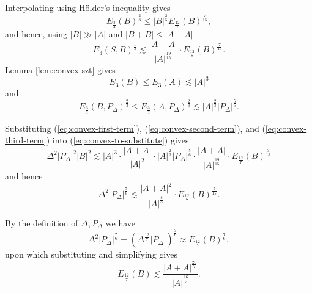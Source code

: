 \documentclass[reqno]{amsart}
\newcommand{\holder}{H\"older}
\numberwithin{equation}{section}
\begin{document}
Interpolating using \holder's inequality gives
\[
    E_{\frac{3}{2} } (B)^{\frac{2}{3} } \leq \left\lvert B \right\rvert ^{\frac{2}{5} }  E_{\frac{12}{7} } (B) ^{\frac{7}{15} }
,\]
and hence, using \(\left\lvert B \right\rvert \gg \left\lvert A \right\rvert \) and \(\left\lvert B+B \right\rvert \leq \left\lvert A+A \right\rvert \)
\begin{equation} \label{eq:convex-first-term}
    E_{3} (S,B)^{\frac{1}{3} }\lesssim \frac{\left\lvert A+A \right\rvert }{\left\lvert A \right\rvert ^{\frac{19}{15} }} \cdot E_{\frac{12}{7} } (B)^{\frac{7}{15} }.
\end{equation}
Lemma \ref{lem:convex-szt} gives
\begin{equation} \label{eq:convex-second-term}
    E_3(B) \leq E_3(A) \lesssim \left\lvert A \right\rvert ^{3} 
\end{equation}
and
\begin{equation} \label{eq:convex-third-term}
    E_{\frac{3}{2} }  (B,P_{\Delta} )^{\frac{2}{3} } \leq E_{\frac{3}{2} } (A,P_{\Delta} )^{\frac{2}{3} } \lesssim \left\lvert A \right\rvert ^{\frac{2}{3} }\left\lvert P_{\Delta} \right\rvert ^{\frac{5}{6} }.
\end{equation}  

Substituting (\ref{eq:convex-first-term}), (\ref{eq:convex-second-term}), and (\ref{eq:convex-third-term}) into (\ref{eq:convex-to-substitute})
gives
\[
    \Delta^{2} \left\lvert P_{\Delta}  \right\rvert ^{2} \left\lvert B \right\rvert ^{2} \lesssim \left\lvert A \right\rvert ^{3}  \cdot \frac{\left\lvert A+A \right\rvert }{\left\lvert A \right\rvert ^{2}} \cdot \left\lvert A \right\rvert ^{\frac{2}{3} }\left\lvert P_{\Delta}  \right\rvert ^{\frac{5}{6} }\cdot \frac{\left\lvert A+A \right\rvert }{\left\lvert A \right\rvert^{\frac{19}{15} }}\cdot E_{\frac{12}{7} } (B)^{\frac{7}{15} } 
\]
and hence
\[
    \Delta^{2}\left\lvert P_{\Delta}  \right\rvert ^{\frac{7}{6} } \lesssim \frac{\left\lvert A+A \right\rvert ^{2}}{\left\lvert A \right\rvert ^{\frac{8}{5} }}  \cdot E_{\frac{12}{7} } (B)^{\frac{7}{15} }
.\]

By the definition of \(\Delta, P_{\Delta} \) we have
\[
    \Delta ^{2}\left\lvert P_{\Delta}  \right\rvert ^{\frac{7}{6} } = \left( \Delta^{\frac{12}{7} } \left\lvert P_{\Delta}  \right\rvert  \right) ^{\frac{7}{6} } \approx E_{\frac{12}{7} } (B) ^{\frac{7}{6} }
,\]
upon which substituting and simplifying gives
\[
    E_{\frac{12}{7} } (B)\lesssim \frac{\left\lvert A+A \right\rvert ^{\frac{20}{7} }}{\left\lvert A \right\rvert ^{\frac{16}{7} }} 
.\]
\end{document}
